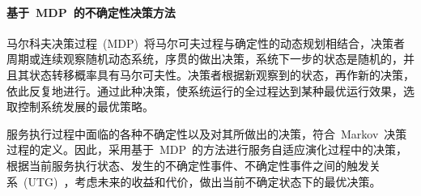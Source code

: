 \paragraph{基于~MDP~的不确定性决策方法}

马尔科夫决策过程~(MDP)~将马尔可夫过程与确定性的动态规划相结合，决策者周期或连续观察随机动态系统，序贯的做出决策，系统下一步的状态是随机的，并且其状态转移概率具有马尔可夫性。决策者根据新观察到的状态，再作新的决策，依此反复地进行。通过此种决策，使系统运行的全过程达到某种最优运行效果，选取控制系统发展的最优策略。


服务执行过程中面临的各种不确定性以及对其所做出的决策，符合~Markov~决策过程的定义。因此，采用基于~MDP~的方法进行服务自适应演化过程中的决策，根据当前服务执行状态、发生的不确定性事件、不确定性事件之间的触发关系~(UTG)~，考虑未来的收益和代价，做出当前不确定状态下的最优决策。

%
%
%
%
%
%

